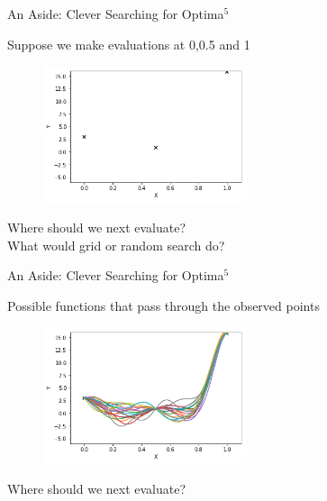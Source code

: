 \documentclass{beamer}
\begin{document}
\begin{frame}{An Aside: Clever Searching for Optima$^5$}
	\begin{block}{}
	Suppose we make evaluations at 0,0.5 and 1
	
	
	\begin{figure}[h]
		\begin{center}
			\includegraphics[height=4cm]{points}
		\end{center}
	\end{figure}
	Where should we next evaluate? \\
	What would grid or random search do?
\end{block}
\end{frame}

\begin{frame}{An Aside: Clever Searching for Optima$^5$}
	\begin{block}{}
	Possible functions that pass through the observed points
	
	
	\begin{figure}[h]
		\begin{center}
			\includegraphics[height=4cm]{functions}
		\end{center}
	\end{figure}
	Where should we next evaluate?
\end{block}
\end{frame}
\end{document}
